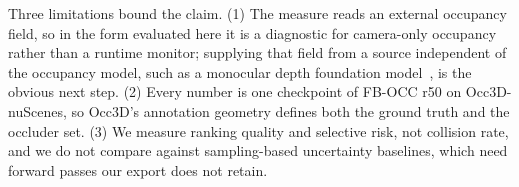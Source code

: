 \documentclass[10pt,twocolumn,letterpaper]{article}
\begin{document}
Three limitations bound the claim. (1) The measure reads an external
occupancy field, so in the form evaluated here it is a diagnostic for
camera-only occupancy rather than a runtime monitor; supplying that field
from a source independent of the occupancy model, such as a monocular depth
foundation model~\cite{bochkovskii2024depthpro, hu2024metric3dv2}, is the
obvious next step. (2) Every number is one checkpoint of FB-OCC r50 on
Occ3D-nuScenes, so Occ3D's annotation geometry defines both the ground
truth and the occluder set. (3) We measure ranking quality and selective
risk, not collision rate, and we do not compare against sampling-based
uncertainty baselines, which need forward passes our export does not
retain.

{\small
{}

}
\end{document}
